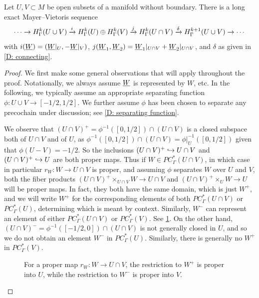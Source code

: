 \begin{theorem}\label{T: absolute MV}
	Let $U,V \subset M$ be open subsets of a manifold without boundary.
	There is a long exact Mayer--Vietoris sequence
	\[
	\cdots \to H^k_\Gamma(U \cup V) \xrightarrow{i} H^k_\Gamma(U) \oplus H^k_\Gamma(V) \xrightarrow{j} H^k_\Gamma(U \cap V) \xrightarrow{\delta} H^{k+1}_\Gamma(U \cup V)\to\cdots
	\]
	with $i(\underline{W}) = (\underline{W}|_U, -\underline{W}|_V)$, $j(\underline{W}_1,\underline{W}_2) = \underline{W}_1|_{U \cap V}+\underline{W}_2|_{U \cap V}$, and $\delta$ as given in \cref{D: connecting}.
\end{theorem}

\begin{proof}
	We first make some general observations that will apply throughout the proof.
	Notationally, we always assume $\underline{W}$ is represented by $W$, etc.
	In the following, we typically assume an appropriate separating function $\phi \colon U \cup V \to [-1/2,1/2]$.
	We further assume $\phi$ has been chosen to separate any precochain under discussion;
	see \cref{D: separating function}.


	We observe that $(U \cap V)^+ = \phi^{-1}([0,1/2])\cap(U \cap V)$ is a closed subspace both of $U \cap V$ and of $U$, as $\phi^{-1}([0,1/2]) \cap (U \cap V) = \phi|_U^{-1}([0,1/2])$ given that $\phi(U - V) = -1/2$.
	So the inclusions $(U \cap V)^+ \hookrightarrow U \cap V$ and $(U \cap V)^+ \hookrightarrow U$ are both proper maps.
	Thus if $W \in PC^*_\Gamma(U \cap V)$, in which case in particular $r_W \colon W \to U \cap V$ is proper, and assuming $\phi$ separates $W$ over $U$ and $V$, both the fiber products $(U \cap V)^+\times_{U \cap V} W \to U \cap V$ and $(U \cap V)^+\times_{U} W \to U$ will be proper maps.
	In fact, they both have the same domain, which is just $W^+$, and we will write $W^+$ for the corresponding elements of both $PC^*_\Gamma(U \cap V)$ or $PC^*_\Gamma(U)$, determining which is meant by context.
	Similarly, $W^-$ can represent an element of either $PC^*_\Gamma(U \cap V)$ or $PC^*_\Gamma(V)$.
	See \cref{F: MV1}.
	On the other hand, $(U \cap V)^- = \phi^{-1}([-1/2,0])\cap(U \cap V)$ is not generally closed in $U$, and so we do not obtain an element $W^-$ in $PC^*_\Gamma(U)$.
	Similarly, there is generally no $W^+$ in $PC^*_\Gamma(V)$.

	\begin{figure}[h]
		
		\caption{For a proper map $r_W \colon W \to U \cap V$, the restriction to $W^+$ is proper into $U$, while the restriction to $W^-$ is proper into $V$.}
		\label{F: MV1}
	\end{figure}


\end{proof}
